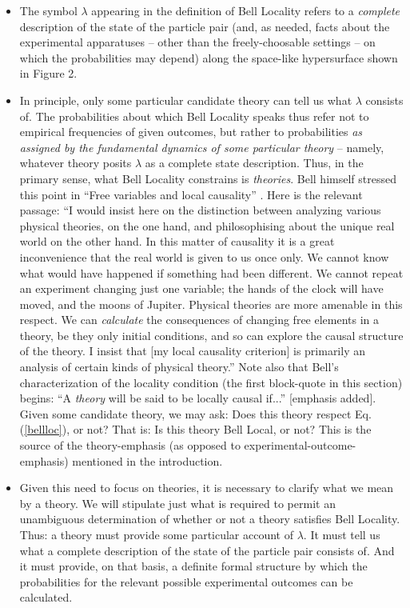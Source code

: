 \documentclass[aps,prc,onecolumn,12pt]{revtex4-2}
\begin{document}
\begin{itemize}

\item The symbol $\lambda$ appearing in the definition of Bell
  Locality refers to a \emph{complete} description of the state of the
  particle pair (and, as needed, facts about the experimental apparatuses
  -- other than the freely-choosable settings -- on which the probabilities may
  depend) along the space-like hypersurface shown in Figure 2.

\item  In
  principle, only some particular candidate theory can tell us what
  $\lambda$ consists of.  The probabilities about which Bell Locality
  speaks thus refer
  not to empirical frequencies of given outcomes, but rather to
  probabilities \emph{as assigned by the fundamental dynamics of
  some particular theory} -- namely, whatever theory posits $\lambda$
  as a complete state description.  Thus, in the
  primary sense, what Bell Locality constrains is \emph{theories}.
Bell himself stressed this point in ``Free variables and local
  causality'' \cite[pg 100-104]{bell}.  Here is the relevant passage:
``I would insist here on the
distinction between analyzing various physical theories, on the one
hand, and philosophising about the unique real world on the other
hand.  In this matter of causality it is a great inconvenience that
the real world is given to us once only.  We cannot know what would
have happened if something had been different.  We cannot repeat an
experiment changing just one variable; the hands of the clock will
have moved, and the moons of Jupiter.  Physical theories are more
amenable in this respect.  We can \emph{calculate} the consequences of
changing free elements in a theory, be they only initial conditions,
and so can explore the causal structure of the theory.  I insist that
[my local causality criterion] is primarily an analysis of certain kinds
of physical theory.''  Note also that Bell's characterization of the
  locality condition (the first block-quote in this section)
  begins:  ``A \emph{theory} will be
  said to be locally causal if...'' [emphasis added].
  Given some candidate theory, we may ask:  Does this theory
  respect Eq. (\ref{bellloc}), or not?  That is:  Is this theory
  Bell Local, or not?  This is the source of the theory-emphasis (as
  opposed to experimental-outcome-emphasis) mentioned in the
  introduction.

\item  Given this need to focus on theories, it is necessary to
  clarify what we mean by a theory.  We will stipulate just
  what is required to permit an unambiguous determination of whether or
  not a theory satisfies Bell Locality.  Thus:  a theory must
  provide some particular account of $\lambda$.  It must tell us what
  a complete description of the state of the particle pair consists
  of.  And it must provide, on that basis,
  a definite formal structure by which the
  probabilities for the relevant possible experimental outcomes can be
  calculated.

\end{itemize}
\end{document}
